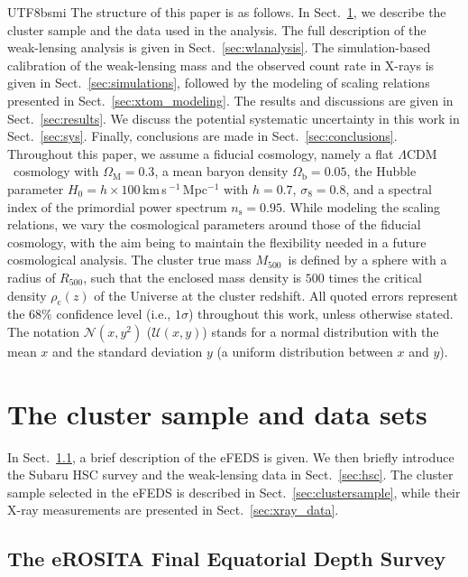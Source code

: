 \documentclass[longauth]{aa}
\newcommand{\LCDM}{\ensuremath{\Lambda\textrm{CDM}}}
\newcommand{\OmegaM}{\ensuremath{\Omega_{\mathrm{M}}}}
\newcommand{\Omegab}{\ensuremath{\Omega_{\mathrm{b}}}}
\newcommand{\Hnow}{\ensuremath{H_{0}}}
\newcommand{\sigmaeight}{\ensuremath{\sigma_{8}}}
\newcommand{\Rfiveoo}{\ensuremath{R_{500}}}
\newcommand{\Mfiveoo}{\ensuremath{M_{500}}}
\newcommand{\redshift}{\ensuremath{z}}
\newcommand{\rhocrit}{\ensuremath{\rho_{\mathrm{c}}}}
\newcommand{\percent}{\ensuremath{\%}}
\begin{document}
\begin{CJK*}{UTF8}{bsmi}
The structure of this paper is as follows.
In Sect.~\ref{sec:data}, we describe the cluster sample and the data used in the analysis.
The full description of the weak-lensing analysis is given in Sect.~\ref{sec:wlanalysis}.
The simulation-based calibration of the weak-lensing mass and the observed count rate in X-rays is given in Sect.~\ref{sec:simulations}, followed by the modeling of scaling relations presented in Sect.~\ref{sec:xtom_modeling}.
The results and discussions are given in Sect.~\ref{sec:results}.
We discuss the potential systematic uncertainty in this work in Sect.~\ref{sec:sys}.
Finally, conclusions are made in Sect.~\ref{sec:conclusions}.
Throughout this paper, we assume a fiducial cosmology, namely a flat \LCDM\ cosmology with
$\OmegaM=0.3$,
a mean baryon density $\Omegab=0.05$,
the Hubble parameter $\Hnow = h\times100$\,km\,s\,$^{-1}$\,Mpc$^{-1}$ with
$h=0.7$, $\sigmaeight = 0.8$, and 
a spectral index of the primordial power spectrum $n_{\mathrm{s}}=0.95$.
While modeling the scaling relations, we vary the cosmological parameters around those of the fiducial cosmology, with the aim being to maintain the flexibility needed in a future cosmological analysis.
The cluster true mass \Mfiveoo\ is defined by a sphere with a radius of $\Rfiveoo$, such that the enclosed mass density is $500$ times the critical density $\rhocrit(\redshift)$ of the Universe at the cluster redshift.
All quoted errors represent the $68\percent$ confidence level (i.e., $1\sigma$) throughout this work, unless otherwise stated.
The notation $\mathcal{N}(x,y^2)$ ($\mathcal{U}(x,y)$) stands for a normal distribution with the mean $x$ and the standard deviation $y$ (a uniform distribution between $x$ and $y$). 




%
%

\section{The cluster sample and data sets}
\label{sec:data}

In Sect.~\ref{sec:efeds}, a brief description of the eFEDS is given.
We then briefly introduce the Subaru HSC survey and the weak-lensing data in Sect.~\ref{sec:hsc}.
The cluster sample selected in the eFEDS is described in Sect.~\ref{sec:clustersample}, while their X-ray measurements are presented in Sect.~\ref{sec:xray_data}.

\subsection{The eROSITA Final Equatorial Depth Survey}
\label{sec:efeds}


\end{CJK*}
\end{document}
